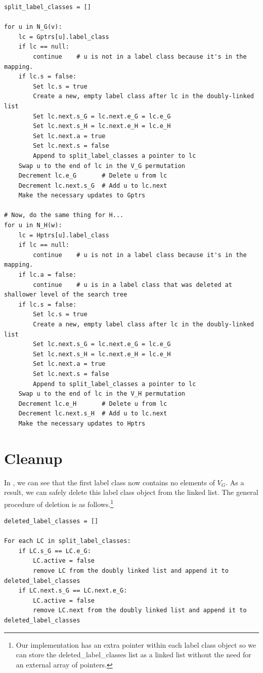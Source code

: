 {
\scriptsize
\begin{verbatim}
split_label_classes = []

for u in N_G(v):
    lc = Gptrs[u].label_class
    if lc == null:
        continue    # u is not in a label class because it's in the mapping.
    if lc.s = false:
        Set lc.s = true
        Create a new, empty label class after lc in the doubly-linked list
        Set lc.next.s_G = lc.next.e_G = lc.e_G
        Set lc.next.s_H = lc.next.e_H = lc.e_H
        Set lc.next.a = true
        Set lc.next.s = false
        Append to split_label_classes a pointer to lc
    Swap u to the end of lc in the V_G permutation
    Decrement lc.e_G       # Delete u from lc
    Decrement lc.next.s_G  # Add u to lc.next
    Make the necessary updates to Gptrs
        
# Now, do the same thing for H...
for u in N_H(w):
    lc = Hptrs[u].label_class
    if lc == null:
        continue    # u is not in a label class because it's in the mapping.
    if lc.a = false:
        continue    # u is in a label class that was deleted at shallower level of the search tree
    if lc.s = false:
        Set lc.s = true
        Create a new, empty label class after lc in the doubly-linked list
        Set lc.next.s_G = lc.next.e_G = lc.e_G
        Set lc.next.s_H = lc.next.e_H = lc.e_H
        Set lc.next.a = true
        Set lc.next.s = false
        Append to split_label_classes a pointer to lc
    Swap u to the end of lc in the V_H permutation
    Decrement lc.e_H       # Delete u from lc
    Decrement lc.next.s_H  # Add u to lc.next
    Make the necessary updates to Hptrs
\end{verbatim}
}

\section{Cleanup}

In , we can see that the first label class
now contains no elements of $V_G$.  As a result, we can safely delete this label
class object from the linked list.  The general procedure of deletion is as
follows.\footnote{Our implementation has an extra pointer within each label
class object so we can store the deleted\_label\_classes list as a linked list
without the need for an external array of pointers.}

{
\scriptsize
\begin{verbatim}
deleted_label_classes = []

For each LC in split_label_classes:
    if LC.s_G == LC.e_G:
        LC.active = false
        remove LC from the doubly linked list and append it to deleted_label_classes
    if LC.next.s_G == LC.next.e_G:
        LC.active = false
        remove LC.next from the doubly linked list and append it to deleted_label_classes
\end{verbatim}
}

